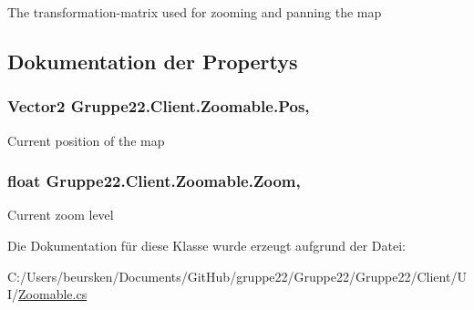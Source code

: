 The transformation-\/matrix used for zooming and panning the map 



\subsection{Dokumentation der Propertys}
\hypertarget{class_gruppe22_1_1_client_1_1_zoomable_aba34634a38c1290ec329919c711f31d1}{
\subsubsection[{Pos}]{\setlength{\rightskip}{0pt plus 5cm}Vector2 Gruppe22.\-Client.\-Zoomable.\-Pos\hspace{0.3cm}{\ttfamily [get]}, {\ttfamily [set]}}}\label{class_gruppe22_1_1_client_1_1_zoomable_aba34634a38c1290ec329919c711f31d1}


Current position of the map 

\hypertarget{class_gruppe22_1_1_client_1_1_zoomable_a4a23fa2ceb4738621d6aaea5bd9fa72f}{
\subsubsection[{Zoom}]{\setlength{\rightskip}{0pt plus 5cm}float Gruppe22.\-Client.\-Zoomable.\-Zoom\hspace{0.3cm}{\ttfamily [get]}, {\ttfamily [set]}}}\label{class_gruppe22_1_1_client_1_1_zoomable_a4a23fa2ceb4738621d6aaea5bd9fa72f}


Current zoom level 



Die Dokumentation für diese Klasse wurde erzeugt aufgrund der Datei\-:\begin{DoxyCompactItemize}
\item 
C\-:/\-Users/beursken/\-Documents/\-Git\-Hub/gruppe22/\-Gruppe22/\-Gruppe22/\-Client/\-U\-I/\hyperlink{_zoomable_8cs}{Zoomable.\-cs}\end{DoxyCompactItemize}
